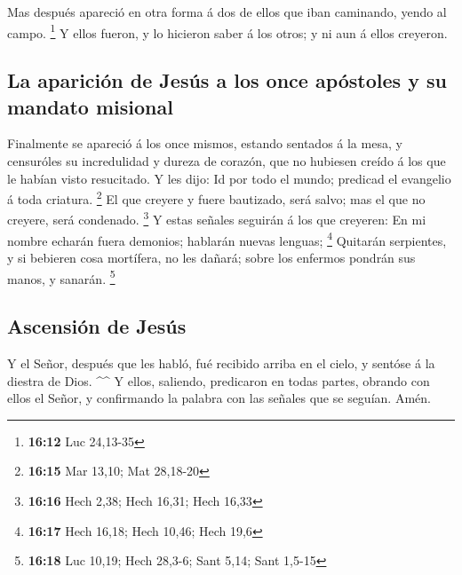  Mas después apareció en otra forma á dos de ellos que iban
caminando, yendo al campo. \footnote{\textbf{16:12} Luc 24,13-35}
 Y ellos fueron, y lo hicieron saber á los otros; y ni aun
á ellos creyeron.

\hypertarget{la-apariciuxf3n-de-jesuxfas-a-los-once-apuxf3stoles-y-su-mandato-misional}{%
\subsection{La aparición de Jesús a los once apóstoles y su mandato
misional}\label{la-apariciuxf3n-de-jesuxfas-a-los-once-apuxf3stoles-y-su-mandato-misional}}

 Finalmente se apareció á los once mismos, estando sentados
á la mesa, y censuróles su incredulidad y dureza de corazón, que no
hubiesen creído á los que le habían visto resucitado.  Y
les dijo: Id por todo el mundo; predicad el evangelio á toda criatura.
\footnote{\textbf{16:15} Mar 13,10; Mat 28,18-20}  El que
creyere y fuere bautizado, será salvo; mas el que no creyere, será
condenado. \footnote{\textbf{16:16} Hech 2,38; Hech 16,31; Hech 16,33}
 Y estas señales seguirán á los que creyeren: En mi nombre
echarán fuera demonios; hablarán nuevas lenguas; \footnote{\textbf{16:17}
  Hech 16,18; Hech 10,46; Hech 19,6}  Quitarán serpientes,
y si bebieren cosa mortífera, no les dañará; sobre los enfermos pondrán
sus manos, y sanarán. \footnote{\textbf{16:18} Luc 10,19; Hech 28,3-6;
  Sant 5,14; Sant 1,5-15}

\hypertarget{ascensiuxf3n-de-jesuxfas}{%
\subsection{Ascensión de Jesús}\label{ascensiuxf3n-de-jesuxfas}}

 Y el Señor, después que les habló, fué recibido arriba en
el cielo, y sentóse á la diestra de Dios. \^{}\^{}  Y
ellos, saliendo, predicaron en todas partes, obrando con ellos el Señor,
y confirmando la palabra con las señales que se seguían. Amén.
